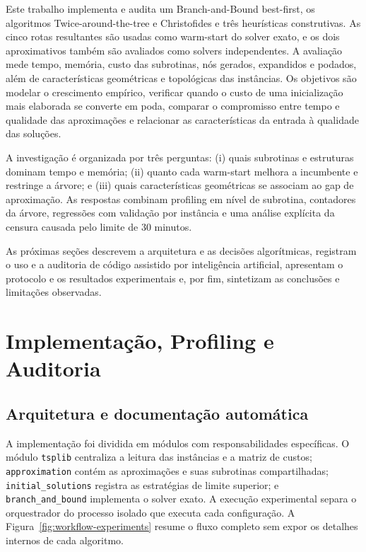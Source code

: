 \documentclass[12pt]{article}
\begin{document}
Este trabalho implementa e audita um Branch-and-Bound best-first, os algoritmos
Twice-around-the-tree e Christofides e três heurísticas construtivas. As cinco
rotas resultantes são usadas como warm-start do solver exato, e os dois
aproximativos também são avaliados como solvers independentes. A avaliação mede
tempo, memória, custo das subrotinas, nós gerados, expandidos e podados, além de
características geométricas e topológicas das instâncias. Os objetivos são
modelar o crescimento empírico, verificar quando o custo de uma inicialização
mais elaborada se converte em poda, comparar o compromisso entre tempo e
qualidade das aproximações e relacionar as características da entrada à
qualidade das soluções.

A investigação é organizada por três perguntas: (i) quais subrotinas e
estruturas dominam tempo e memória; (ii) quanto cada warm-start melhora a
incumbente e restringe a árvore; e (iii) quais características geométricas se
associam ao gap de aproximação. As respostas combinam profiling em nível de
subrotina, contadores da árvore, regressões com validação por instância e uma
análise explícita da censura causada pelo limite de 30 minutos.

As próximas seções descrevem a arquitetura e as decisões algorítmicas, registram
o uso e a auditoria de código assistido por inteligência artificial, apresentam
o protocolo e os resultados experimentais e, por fim, sintetizam as conclusões
e limitações observadas.

\section{Implementação, Profiling e Auditoria}

\subsection{Arquitetura e documentação automática}

A implementação foi dividida em módulos com responsabilidades específicas. O
módulo \texttt{tsplib} centraliza a leitura das instâncias e a matriz de custos;
\texttt{approximation} contém as aproximações e suas subrotinas compartilhadas;
\texttt{initial\_solutions} registra as estratégias de limite superior; e
\texttt{branch\_and\_bound} implementa o solver exato. A execução experimental
separa o orquestrador do processo isolado que executa cada configuração. A
Figura~\ref{fig:workflow-experiments} resume o fluxo completo sem expor os
detalhes internos de cada algoritmo.
\end{document}
